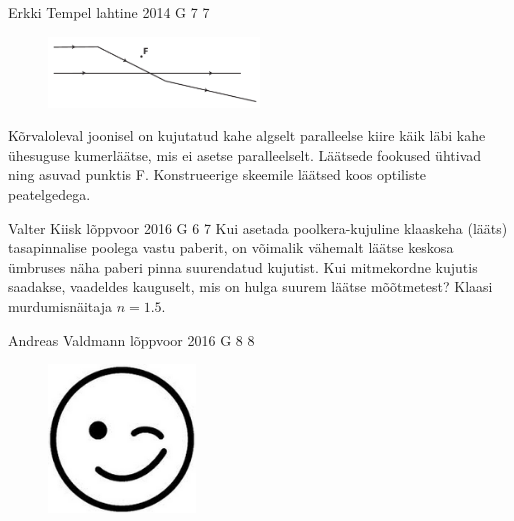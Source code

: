 \documentclass[11pt]{article}
\begin{document}
{%
{Erkki Tempel} %
{lahtine} %
{2014} %
{G 7} %
{7} %
{
\ifStatement
\begin{figure}
 \includegraphics[width=0.5\textwidth]{2014-lahg-07-optilineskeemjoonis}
\end{figure}
Kõrvaloleval joonisel on kujutatud kahe algselt paralleelse kiire käik läbi kahe ühesuguse kumerläätse, mis ei asetse paralleelselt. Läätsede fookused ühtivad ning asuvad punktis F. Konstrueerige skeemile läätsed koos optiliste peatelgedega.
\fi
}

{Valter Kiisk} %
{lõppvoor} %
{2016} %
{G 6} %
{7} %
{
\ifStatement
Kui asetada poolkera-kujuline klaaskeha (lääts) tasapinnalise poolega vastu paberit, on võimalik vähemalt läätse keskosa ümbruses näha paberi pinna suurendatud kujutist. Kui mitmekordne kujutis saadakse, vaadeldes kauguselt, mis on hulga suurem läätse mõõtmetest? Klaasi murdumisnäitaja $n=\num{1.5}$.
\fi
}

{Andreas Valdmann} %
{lõppvoor} %
{2016} %
{G 8} %
{8} %
{
\ifStatement
\begin{figure}
	\vspace{-25pt}
	\begin{center}
		\includegraphics[width=0.35\textwidth]{2016-v3g-08-wink.png}
	\end{center}
	\vspace{-20pt}
\end{figure}

}}
\end{document}
